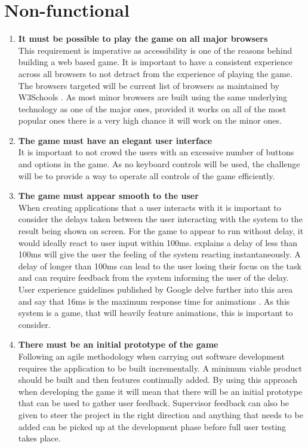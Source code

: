 \documentclass[12pt,a4paper]{report}
\begin{document}
         \section{Non-functional}
   \begin{enumerate}[label*=\arabic*]
            \item \textbf{It must be possible to play the game on all major browsers}\\
            This requirement is imperative as accessibility is one of the reasons behind building a web based game. It is important to have a consistent experience across all browsers to not detract from the experience of playing the game. The browsers targeted will be current list of browsers as maintained by W3Schools \citep{2017}. As most minor browsers are built using the same underlying technology as one of the major ones, provided it works on all of the most popular ones there is a very high chance it will work on the minor ones.    
            
            
                         \item \textbf{The game must have an elegant user interface}\\
It is important to not crowd the users with an excessive number of buttons and options in the game. As no keyboard controls will be used, the challenge will be to provide a way to operate all controls of the game efficiently.
            
                        
                         \item \textbf{The game must appear smooth to the user}\\
When creating applications that a user interacts with it is important to consider the delays taken between the user interacting with the system to the result being shown on screen. For the game to appear to run without delay, it would ideally react to user input within 100ms. \citep{nielsen1994usability} explains a delay of less than 100ms will give the user the feeling of the system reacting instantaneously. A delay of longer than 100ms can lead to the user losing their focus on the task and can require feedback from the system informing the user of the delay. User experience guidelines published by Google delve further into this area and say that 16ms is the maximum response time for animations \citep{kearney_2017}. As this system is a game, that will heavily feature animations, this is important to consider.            
            
             \item \textbf{There must be an initial prototype of the game}\\
            Following an agile methodology when carrying out software development requires the application to be built incrementally. A minimum viable product should be built and then features continually added. By using this approach when developing the game it will mean that there will be an initial prototype that can be used to gather user feedback. Supervisor feedback can also be given to steer the project in the right direction and anything that needs to be added can be picked up at the development phase before full user testing takes place.
            

\end{enumerate}
\end{document}
